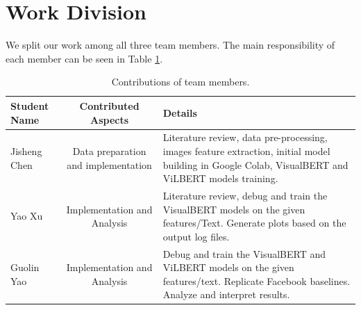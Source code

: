 \documentclass[10pt,twocolumn,letterpaper]{article}
\begin{document}
\section{Work Division}
We split our work among all three team members. The main responsibility of each member can be seen in Table \ref{tab:contributions}.

\begin{table}
\begin{center}
\begin{tabular}{|l|c|p{8cm}|}
\hline
Student Name & Contributed Aspects & Details \\
\hline\hline
Jisheng Chen & Data preparation and implementation & Literature review, data pre-processing, images feature extraction, initial model building in Google Colab,  VisualBERT and ViLBERT models training. \\
Yao Xu & Implementation and Analysis & Literature review, debug and train the VisualBERT models on the given features/Text. Generate plots based on the output log files. \\
Guolin Yao & Implementation and Analysis & Debug and train the VisualBERT and ViLBERT models on the given features/text. Replicate Facebook baselines. Analyze and interpret results.\\

\hline
\end{tabular}
\end{center}
\caption{Contributions of team members.}
\label{tab:contributions}
\end{table}

\newpage
\newpage

{\small


}
\end{document}
